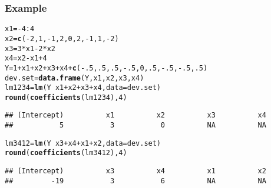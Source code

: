 \documentclass[handout]{beamer}\usepackage[]{graphicx}\usepackage[]{color}
\makeatletter
\newcommand{\hlnum}[1]{\textcolor[rgb]{0.686,0.059,0.569}{#1}}%
\newcommand{\hlopt}[1]{\textcolor[rgb]{0,0,0}{#1}}%
\newcommand{\hlstd}[1]{\textcolor[rgb]{0.345,0.345,0.345}{#1}}%
\newcommand{\hlkwb}[1]{\textcolor[rgb]{0.69,0.353,0.396}{#1}}%
\newcommand{\hlkwc}[1]{\textcolor[rgb]{0.333,0.667,0.333}{#1}}%
\newcommand{\hlkwd}[1]{\textcolor[rgb]{0.737,0.353,0.396}{\textbf{#1}}}%
\newenvironment{kframe}{%
 \def\at@end@of@kframe{}%
 \ifinner\ifhmode%
  \def\at@end@of@kframe{\end{minipage}}%
  \begin{minipage}{\columnwidth}%
 \fi\fi%
 \def\FrameCommand##1{\hskip\@totalleftmargin \hskip-\fboxsep
 \colorbox{shadecolor}{##1}\hskip-\fboxsep
     \hskip-\linewidth \hskip-\@totalleftmargin \hskip\columnwidth}%
 \MakeFramed {\advance\hsize-\width
   \@totalleftmargin\z@ \linewidth\hsize
   \@setminipage}}%
 {\par\unskip\endMakeFramed%
 \at@end@of@kframe}
\newenvironment{knitrout}{}{} %
\makeatother
\begin{document}
\begin{frame}[fragile] \frametitle{Example}

\begin{small}
\begin{knitrout}
\color{fgcolor}\begin{kframe}
\begin{alltt}
\hlstd{x1} \hlkwb{=} \hlopt{-}\hlnum{4}\hlopt{:}\hlnum{4}
\hlstd{x2} \hlkwb{=} \hlkwd{c}\hlstd{(}\hlopt{-}\hlnum{2}\hlstd{,} \hlnum{1}\hlstd{,} \hlopt{-}\hlnum{1}\hlstd{,} \hlnum{2}\hlstd{,} \hlnum{0}\hlstd{,} \hlnum{2}\hlstd{,} \hlopt{-}\hlnum{1}\hlstd{,} \hlnum{1}\hlstd{,} \hlopt{-}\hlnum{2}\hlstd{)}
\hlstd{x3} \hlkwb{=} \hlnum{3}\hlopt{*}\hlstd{x1}  \hlopt{-}\hlnum{2}\hlopt{*}\hlstd{x2}
\hlstd{x4} \hlkwb{=} \hlstd{x2} \hlopt{-} \hlstd{x1} \hlopt{+} \hlnum{4}
\hlstd{Y} \hlkwb{=} \hlnum{1}\hlopt{+}\hlstd{x1}\hlopt{+}\hlstd{x2}\hlopt{+}\hlstd{x3}\hlopt{+}\hlstd{x4} \hlopt{+} \hlkwd{c}\hlstd{(}\hlopt{-}\hlnum{.5}\hlstd{,}\hlnum{.5}\hlstd{,}\hlnum{.5}\hlstd{,}\hlopt{-}\hlnum{.5}\hlstd{,}\hlnum{0}\hlstd{,}\hlnum{.5}\hlstd{,}\hlopt{-}\hlnum{.5}\hlstd{,}\hlopt{-}\hlnum{.5}\hlstd{,}\hlnum{.5}\hlstd{)}
\hlstd{dev.set} \hlkwb{=} \hlkwd{data.frame}\hlstd{(Y, x1, x2, x3, x4)}
\hlstd{lm1234} \hlkwb{=} \hlkwd{lm}\hlstd{(Y} \hlopt{~} \hlstd{x1} \hlopt{+} \hlstd{x2} \hlopt{+} \hlstd{x3} \hlopt{+} \hlstd{x4,} \hlkwc{data}\hlstd{=dev.set)}
\hlkwd{round}\hlstd{(}\hlkwd{coefficients}\hlstd{(lm1234),} \hlnum{4}\hlstd{)}
\end{alltt}
\begin{verbatim}
## (Intercept)          x1          x2          x3          x4 
##           5           3           0          NA          NA
\end{verbatim}
\begin{alltt}
\hlstd{lm3412} \hlkwb{=} \hlkwd{lm}\hlstd{(Y} \hlopt{~} \hlstd{x3} \hlopt{+} \hlstd{x4} \hlopt{+} \hlstd{x1} \hlopt{+} \hlstd{x2,} \hlkwc{data} \hlstd{= dev.set)}
\hlkwd{round}\hlstd{(}\hlkwd{coefficients}\hlstd{(lm3412),} \hlnum{4}\hlstd{)}
\end{alltt}
\begin{verbatim}
## (Intercept)          x3          x4          x1          x2 
##         -19           3           6          NA          NA
\end{verbatim}
\end{kframe}
\end{knitrout}
\end{small}
\end{frame}
\end{document}
